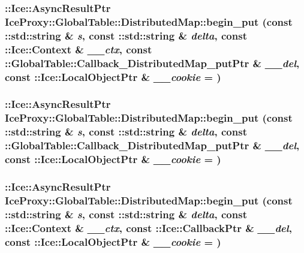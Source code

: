 \label{class_ice_proxy_1_1_global_table_1_1_distributed_map_a806ad7b6fa26ee40c6f4f41f64994946}
\hypertarget{class_ice_proxy_1_1_global_table_1_1_distributed_map_a0d93f9200764c50d0aa60d78efa36cd2}{
\subsubsection[{begin\_\-put}]{\setlength{\rightskip}{0pt plus 5cm}::Ice::AsyncResultPtr IceProxy::GlobalTable::DistributedMap::begin\_\-put (const ::std::string \& {\em s}, \/  const ::std::string \& {\em delta}, \/  const ::Ice::Context \& {\em \_\-\_\-ctx}, \/  const ::{\bf GlobalTable::Callback\_\-DistributedMap\_\-putPtr} \& {\em \_\-\_\-del}, \/  const ::Ice::LocalObjectPtr \& {\em \_\-\_\-cookie} = {})}}
\label{class_ice_proxy_1_1_global_table_1_1_distributed_map_a0d93f9200764c50d0aa60d78efa36cd2}
\hypertarget{class_ice_proxy_1_1_global_table_1_1_distributed_map_ad7e31b9865ae8a78857b251d9fa6bcdb}{
\subsubsection[{begin\_\-put}]{\setlength{\rightskip}{0pt plus 5cm}::Ice::AsyncResultPtr IceProxy::GlobalTable::DistributedMap::begin\_\-put (const ::std::string \& {\em s}, \/  const ::std::string \& {\em delta}, \/  const ::{\bf GlobalTable::Callback\_\-DistributedMap\_\-putPtr} \& {\em \_\-\_\-del}, \/  const ::Ice::LocalObjectPtr \& {\em \_\-\_\-cookie} = {})}}
\label{class_ice_proxy_1_1_global_table_1_1_distributed_map_ad7e31b9865ae8a78857b251d9fa6bcdb}
\hypertarget{class_ice_proxy_1_1_global_table_1_1_distributed_map_a1f47f535d113d8ffad751119a6b7fbab}{
\subsubsection[{begin\_\-put}]{\setlength{\rightskip}{0pt plus 5cm}::Ice::AsyncResultPtr IceProxy::GlobalTable::DistributedMap::begin\_\-put (const ::std::string \& {\em s}, \/  const ::std::string \& {\em delta}, \/  const ::Ice::Context \& {\em \_\-\_\-ctx}, \/  const ::Ice::CallbackPtr \& {\em \_\-\_\-del}, \/  const ::Ice::LocalObjectPtr \& {\em \_\-\_\-cookie} = {})}}
